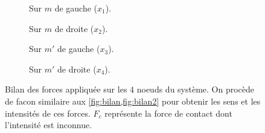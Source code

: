 \begin{figure}[!h]
    \begin{subfigure}[b]{0.30\textwidth}
        \centering
        \caption{Sur $m$ de gauche ($x_1$).}
        \label{fig:bilan13}
    \end{subfigure}
    \begin{subfigure}[b]{0.42\textwidth}
        \centering
        \caption{Sur $m$ de droite ($x_2$).}
        \label{fig:bilan23}
    \end{subfigure}
    \begin{subfigure}[b]{0.423\textwidth}
        \centering
        \caption{Sur $m'$ de gauche ($x_3$).}
        \label{fig:bilan33}
    \end{subfigure}
    \begin{subfigure}[b]{0.297\textwidth}
        \centering
        \caption{Sur $m'$ de droite ($x_4$).}
        \label{fig:bilan43}
    \end{subfigure}
       \caption{Bilan des forces appliquée sur les $4$ noeuds du système. On procède de facon similaire aux \cref{fig:bilan,fig:bilan2} pour obtenir les sens et les intensités de ces forces. $F_c$ représente la force de contact dont l'intensité est inconnue.}
       \label{fig:bilan3}
\end{figure}

